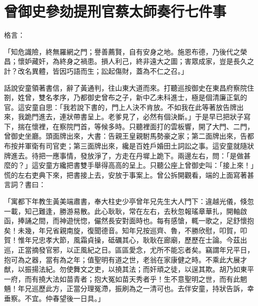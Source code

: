 %

\chapter{曾御史參劾提刑官\KG 蔡太師奏行七件事}

格言：

「知危識險，終無羅網之門；譽善薦賢，自有安身之地。施恩布德，乃後代之榮昌；懷妒藏奸，為終身之禍患。損人利己，終非遠大之圖；害眾成家，豈是長久之計？改名異體，皆因巧語而生；訟起傷財，蓋為不仁之召。」

話說安童領著書信，辭了黃通判，往山東大道而來。打聽巡按御史在東昌府察院住劄，姓曾，雙名孝序，乃都御史曾布之子，新中乙未科進士，極是個清廉正氣的官。這安童自思：「我若說下書的，門上人決不肯放。不如我在此等著放告牌出來，我跪門進去，連狀帶書呈上。老爹見了，必然有個決斷。」于是早已把狀子寫下，揣在懷裡，在察院門首，等候多時。只聽裡面打的雲板響，開了大門、二門，曾御史坐廳。頭面牌出來，大書：告親王皇親駙馬勢豪之家；第二面牌出來，告都布按并軍衛有司官吏；第三面牌出來，纔是百姓戶婚田土詞訟之事。這安童就隨狀牌進去。待把一應事情，發放淨了，方走在丹墀上跪下。兩邊左右，問：「是做甚麼的？」這安童方纔把書雙手舉得高高的呈上。只聽公座上曾御史叫：「接上來！」慌的左右吏典下來，把書接上去，安放于事案上。曾公拆開觀看，端的上面寫著甚言詞？書曰：

「寓都下年教生黃美端肅書，奉大柱史少亭曾年兄先生大人門下：違越光儀，倏忽一載，知己難逢，勝游易散。此心耿耿，常在左右，去秋忽報瑤章華扎，開軸啟函，捧誦之間，而神遊恍惚，儼然長安對面時也。每有感愴，輒一歌之，足舒懷抱矣！未幾，年兄省親南旋，復聞德音。知年兄按巡齊、魯，不勝欣慰，叩賀，叩賀！惟年兄忠孝大節，風霜貞操，砥礪其心，耿耿在廊廟，歷歷在士論。今茲出巡，正當摘發官邪，以正風紀之日。區區愛念，尤所不能忘者矣。竊謂年兄平日，抱可為之器，當有為之年；值聖明有道之世，老翁在家康健之時。不乘此大展才猷，以振揚法紀。勿使舞文之吏，以撓其法；而奸頑之徒，以逞其欺。胡乃如東平一府，而有撓大法如苗青者；抱大冤如苗天秀者乎！生不意聖明之世，而有此魍魎！年兄巡歷此方，正當分理冤滯，振刷為之一清可也。去伴安童，持狀告訴，幸垂察。不宜。仲春望後一日具。」

